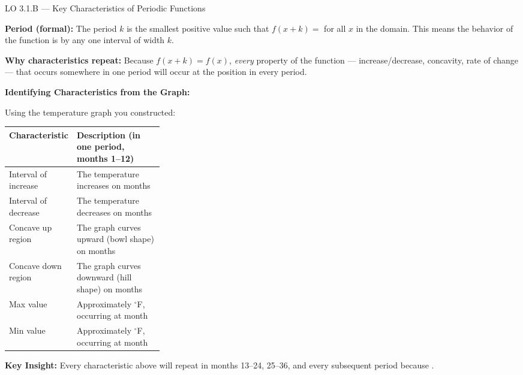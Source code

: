 \documentclass[10pt]{article}
\begin{document}
\begin{notesbox}{LO 3.1.B --- Key Characteristics of Periodic Functions}

\textbf{Period (formal):} The period $k$ is the smallest positive value such
that $f(x + k) = $ \underline{\hspace{2cm}} for all $x$ in the domain.
This means the behavior of the function is \underline{\hspace{5cm}}
by any one interval of width $k$.

\vspace{8pt}
\textbf{Why characteristics repeat:} Because $f(x+k)=f(x)$, \emph{every}
property of the function --- increase/decrease, concavity, rate of change ---
that occurs somewhere in one period will occur at the
\underline{\hspace{4cm}} position in every period.

\vspace{8pt}
\textbf{Identifying Characteristics from the Graph:}

Using the temperature graph you constructed:

\vspace{4pt}
\renewcommand{\arraystretch}{1.6}
\begin{tabularx}{\linewidth}{@{} p{0.30\linewidth} X @{}}
\hline
\textbf{Characteristic} & \textbf{Description (in one period, months 1--12)} \\
\hline
Interval of increase & The temperature increases on months \underline{\hspace{3cm}} \\
Interval of decrease & The temperature decreases on months \underline{\hspace{3cm}} \\
Concave up region & The graph curves upward (bowl shape) on months \underline{\hspace{2.5cm}} \\
Concave down region & The graph curves downward (hill shape) on months \underline{\hspace{2.5cm}} \\
Max value & Approximately \underline{\hspace{1.5cm}}${}^\circ$F, occurring at month \underline{\hspace{1cm}} \\
Min value & Approximately \underline{\hspace{1.5cm}}${}^\circ$F, occurring at month \underline{\hspace{1cm}} \\
\hline
\end{tabularx}

\vspace{8pt}
\textbf{Key Insight:} Every characteristic above will repeat in months 13--24,
25--36, and every subsequent period because \underline{\hspace{6cm}}.

\end{notesbox}
\end{document}
